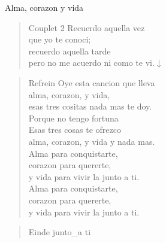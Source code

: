 \begin{song}[vals]{Alma, corazon y vida}
\begin{verse}{Couplet 2}
	\hspace{0.6cm}Recuerdo aquella vez\\
	\hspace{0.6cm}que yo te conoci;\\ 
	\hspace*{0.6cm}recuerdo aquella tarde\\      
	\hspace*{0.6cm}pero no me acuerdo ni como te vi.\hspace{0.5cm}$\downarrow$
\end{verse}
\begin{verse}{Refrein}
Oye esta cancion que lleva\\
alma, corazon, y vida,\\
esas tres cositas nada mas te doy.\\
Porque no tengo fortuna\\
Esas tres cosas te ofrezco\\
alma, corazon, y vida y nada mas.\\
Alma para conquistarte,\\ 
corazon para quererte,\\ 
y vida para vivir la junto a ti.\hspace{0.6cm}    \\
Alma para conquistarte,\\
corazon para quererte,\\
y vida para vivir la junto a ti.\\
\end{verse}

\begin{verse}{Einde}
junto\_a ti\hspace{1.5em}  \hspace{1.5em} \\
\end{verse}


\end{song}
